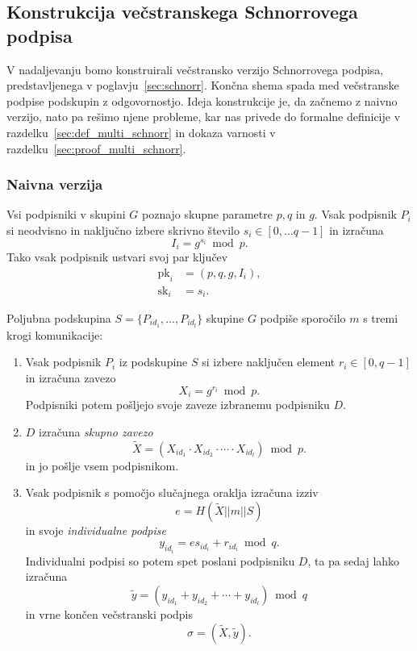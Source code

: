 \documentclass[isrm2, tisk]{fmfdelo}
\begin{document}
\subsection{Konstrukcija večstranskega Schnorrovega podpisa}
V nadaljevanju bomo konstruirali večstransko verzijo Schnorrovega podpisa, predstavljenega v
poglavju~\ref{sec:schnorr}. Končna shema spada med večstranske podpise podskupin z odgovornostjo.
Ideja konstrukcije je, da začnemo z naivno verzijo, nato pa rešimo njene probleme, kar nas
privede do formalne definicije v razdelku~\ref{sec:def_multi_schnorr} in dokaza varnosti v
razdelku~\ref{sec:proof_multi_schnorr}.

\subsubsection{Naivna verzija}
Vsi podpisniki v skupini $G$ poznajo skupne parametre $p, q$ in $g$. Vsak podpisnik $P_i$ si 
neodvisno in naključno izbere skrivno število $s_i \in [0, \dots q-1]$ in izračuna 
$$ 
I_i = g^{s_i} \bmod p.
$$
Tako vsak podpisnik ustvari svoj par ključev
\begin{align*}
    \text{pk}_i &= (p, q, g, I_i), \\
    \text{sk}_i &= s_i.
\end{align*}

Poljubna podskupina $S =\{P_{id_1}, \dots, P_{id_l}\}$ skupine $G$ podpiše sporočilo $m$ s tremi 
krogi komunikacije:
\begin{enumerate}
    \item Vsak podpisnik $P_i$ iz podskupine $S$ si izbere naključen element $r_i \in [0, q-1]$ 
        in izračuna zavezo 
        $$ 
        X_i = g^{r_i} \bmod p.
        $$
        Podpisniki potem pošljejo svoje zaveze izbranemu podpisniku $D$. 
    \item $D$ izračuna \textit{skupno zavezo} 
        $$ 
        \tilde{X} = (X_{id_1} \cdot X_{id_2} \cdot \cdots \cdot X_{id_l}) \bmod p.
        $$
        in jo pošlje vsem podpisnikom.
    \item Vsak podpisnik s pomočjo slučajnega oraklja izračuna izziv 
        $$ 
        e = H(\tilde{X} || m || S)
        $$
        in svoje \textit{individualne podpise} 
        $$ 
        y_{id_i} = e s_{id_i} + r_{id_i} \bmod q.
        $$
        Individualni podpisi so potem spet poslani podpisniku $D$, ta pa sedaj lahko 
        izračuna 
        $$ 
        \tilde{y} = (y_{id_1} + y_{id_2} + \cdots + y_{id_l}) \bmod q 
        $$
        in vrne končen večstranski podpis
        $$ 
        \sigma = (\tilde{X}, \tilde{y}).
        $$
\end{enumerate}
\end{document}
